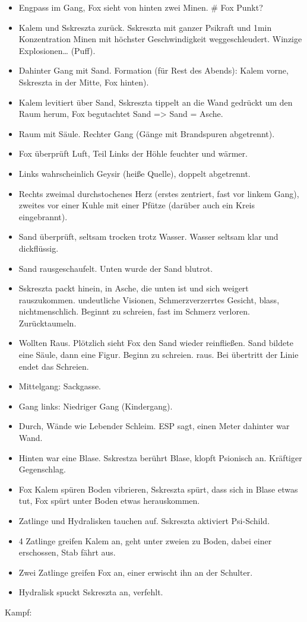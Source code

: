 \documentclass[11pt]{scrartcl}
\begin{document}
\begin{itemize}
\item
  Engpass im Gang, Fox sieht von hinten zwei Minen. \# Fox Punkt?
\item
  Kalem und Sskreszta zurück. Sskreszta mit ganzer Psikraft und 1min
  Konzentration Minen mit höchster Geschwindigkeit weggeschleudert.
  Winzige Explosionen\ldots{} (Puff).
\item
  Dahinter Gang mit Sand. Formation (für Rest des Abends): Kalem vorne,
  Sskreszta in der Mitte, Fox hinten).
\item
  Kalem levitiert über Sand, Sskreszta tippelt an die Wand gedrückt um
  den Raum herum, Fox begutachtet Sand =\textgreater{} Sand = Asche.
\item
  Raum mit Säule. Rechter Gang (Gänge mit Brandspuren abgetrennt).
\item
  Fox überprüft Luft, Teil Links der Höhle feuchter und wärmer.
\item
  Links wahrscheinlich Geysir (heiße Quelle), doppelt abgetrennt.
\item
  Rechts zweimal durchstochenes Herz (erstes zentriert, fast vor linkem
  Gang), zweites vor einer Kuhle mit einer Pfütze (darüber auch ein
  Kreis eingebrannt).
\item
  Sand überprüft, seltsam trocken trotz Wasser. Wasser seltsam klar und
  dickflüssig.
\item
  Sand rausgeschaufelt. Unten wurde der Sand blutrot.
\item
  Sskreszta packt hinein, in Asche, die unten ist und sich weigert
  rauszukommen. undeutliche Visionen, Schmerzverzerrtes Gesicht, blass,
  nichtmenschlich. Beginnt zu schreien, fast im Schmerz verloren.
  Zurücktaumeln.
\item
  Wollten Raus. Plötzlich sieht Fox den Sand wieder reinfließen. Sand
  bildete eine Säule, dann eine Figur. Beginn zu schreien. raus. Bei
  übertritt der Linie endet das Schreien.
\item
  Mittelgang: Sackgasse.
\item
  Gang links: Niedriger Gang (Kindergang).
\item
  Durch, Wände wie Lebender Schleim. ESP sagt, einen Meter dahinter war
  Wand.
\item
  Hinten war eine Blase. Sskrestza berührt Blase, klopft Psionisch an.
  Kräftiger Gegenschlag.
\item
  Fox Kalem spüren Boden vibrieren, Sskreszta spürt, dass sich in Blase
  etwas tut, Fox spürt unter Boden etwas herauskommen.
\item
  Zatlinge und Hydralisken tauchen auf. Sskreszta aktiviert Psi-Schild.
\item
  4 Zatlinge greifen Kalem an, geht unter zweien zu Boden, dabei einer
  erschossen, Stab fährt aus.
\item
  Zwei Zatlinge greifen Fox an, einer erwischt ihn an der Schulter.
\item
  Hydralisk spuckt Sskreszta an, verfehlt.
\end{itemize}
Kampf:
\end{document}
